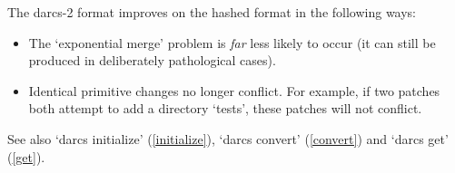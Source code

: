 The darcs-2 format improves on the hashed format in the following
ways:

\begin{itemize}
\item The `exponential merge' problem is \emph{far} less likely to
  occur (it can still be produced in deliberately pathological cases).
\item Identical primitive changes no longer conflict.  For example, if
  two patches both attempt to add a directory `tests', these patches
  will not conflict.
\end{itemize}


See also `darcs initialize' (\ref{initialize}), `darcs convert'
(\ref{convert}) and `darcs get' (\ref{get}).
